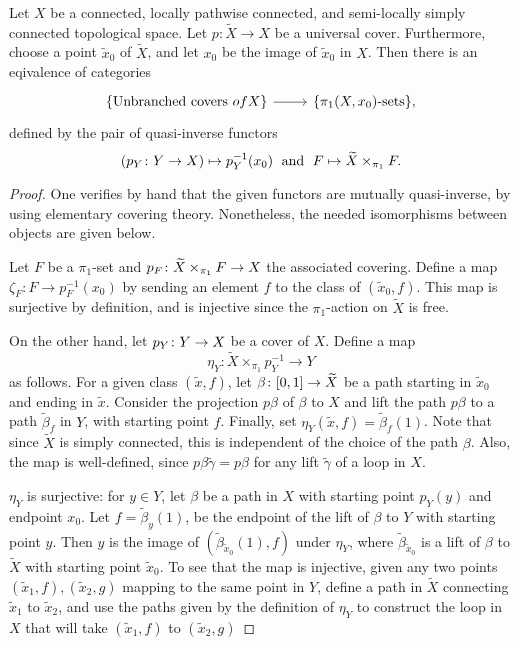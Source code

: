 \begin{prop}

 Let $X$ be a connected, locally pathwise connected, and semi-locally simply connected topological space. Let $p:\widetilde{X}\to X$ be a universal cover. Furthermore, choose a point $\widetilde{x}_0$ of $\widetilde{X}$, and let $x_0$ be the image of $\widetilde{x}_0$ in $X$. Then there is an eqivalence of categories
 \[
 \begin{tikzcd}
  \{\text{Unbranched covers } of X\} \arrow{r} & \{\pi_1(X,x_0)\text{-sets}\},
 \end{tikzcd}
 \]
 defined by the pair of quasi-inverse functors \[(p_Y\colon Y\to X) \mapsto p^{-1}_Y(x_0)\;\text{ and }\;F \mapsto \widetilde{X} \times_{\pi_1} F.\]
\end{prop}
\begin{proof}
 One verifies by hand that the given functors are mutually quasi-inverse, by using elementary covering theory. Nonetheless, the needed isomorphisms between objects are given below.
 
 Let $F$ be a $\pi_1$-set and $p_F\colon \widetilde{X} \times_{\pi_1} F \to X$ the associated covering. Define a map $\zeta_F: F\to p_F^{-1}(x_0)$ by sending an element $f$ to the class of $(\widetilde{x}_0,f)$. This map is surjective by definition, and is injective since the $\pi_1$-action on $\widetilde{X}$ is free.
 
 On the other hand, let $p_Y\colon Y\to X$ be a cover of $X$. Define a map \[\eta_Y: \widetilde{X}\times_{\pi_1} p_Y^{-1} \to Y\] as follows. For a given class $(\widetilde{x},f)$, let $\beta\colon [0,1] \to \widetilde{X}$ be a path starting in $\widetilde{x}_0$ and ending in $\widetilde{x}$. Consider the projection $p\beta$ of $\beta$ to $X$ and lift the path $p\beta$ to a path $\widetilde{\beta}_f$ in $Y$, with starting point $f$. Finally, set $\eta_Y(\widetilde{x},f)=\widetilde{\beta}_f(1)$. Note that since $\widetilde{X}$ is simply connected, this is independent of the choice of the path $\beta$. Also, the map is well-defined, since $p\beta \widetilde{\gamma} = p\beta$ for any lift $\widetilde{\gamma}$ of a loop in $X$.
 
 $\eta_Y$ is surjective: for $y \in Y$, let $\beta$ be a path in $X$ with starting point $p_Y(y)$ and endpoint $x_0$. Let $f=\widetilde{\beta}_{y}(1)$, be the endpoint of the lift of $\beta$ to $Y$ with starting point $y$. Then $y$ is the image of $(\widetilde{\beta}_{\widetilde{x}_0}(1),f)$ under $\eta_Y$, where $\widetilde{\beta}_{\widetilde{x}_0}$ is a lift of $\beta$ to $\widetilde{X}$ with starting point $\widetilde{x}_0$. To see that the map is injective, given any two points $(\widetilde{x}_1,f),(\widetilde{x}_2,g)$ mapping to the same point in $Y$, define a path in $\widetilde{X}$ connecting $\widetilde{x}_1$ to $\widetilde{x}_2$, and use the paths given by the definition of $\eta_Y$ to construct the loop in $X$ that will take $(\widetilde{x}_1,f)$ to $(\widetilde{x}_2,g)$
\end{proof}

